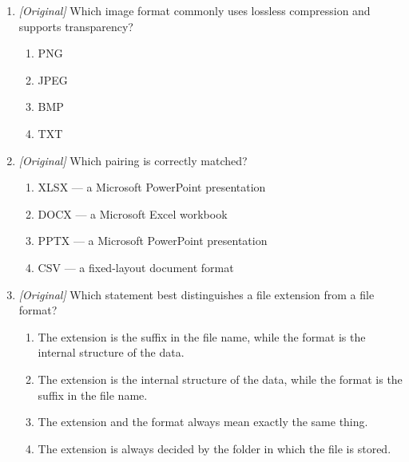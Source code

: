 \documentclass[11pt]{article}
\begin{document}
\begin{enumerate}[label=\textbf{Q\arabic*.}, leftmargin=*]
\begin{enumerate}[label=\Alph*.]
  \end{enumerate}
\item \textit{[Original]} Which image format commonly uses lossless
  compression and supports transparency?
  \begin{enumerate}[label=\Alph*.]
    \item PNG
    \item JPEG
    \item BMP
    \item TXT
  \end{enumerate}
\item \textit{[Original]} Which pairing is correctly matched?
  \begin{enumerate}[label=\Alph*.]
    \item XLSX --- a Microsoft PowerPoint presentation
    \item DOCX --- a Microsoft Excel workbook
    \item PPTX --- a Microsoft PowerPoint presentation
    \item CSV --- a fixed-layout document format
  \end{enumerate}
\item \textit{[Original]} Which statement best distinguishes a file extension
  from a file format?
  \begin{enumerate}[label=\Alph*.]
    \item The extension is the suffix in the file name, while the format is
      the internal structure of the data.
    \item The extension is the internal structure of the data, while the
      format is the suffix in the file name.
    \item The extension and the format always mean exactly the same thing.
    \item The extension is always decided by the folder in which the file is
      stored.
  \end{enumerate}


\end{enumerate}
\end{document}
